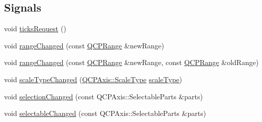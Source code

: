 \subsection*{Signals}
\begin{DoxyCompactItemize}
\item 
void \hyperlink{class_q_c_p_axis_af46d99613d29518795134ec4928e3873}{ticks\+Request} ()
\item 
void \hyperlink{class_q_c_p_axis_a0894084e4c16a1736534c4095746f910}{range\+Changed} (const \hyperlink{class_q_c_p_range}{Q\+C\+P\+Range} \&new\+Range)
\item 
void \hyperlink{class_q_c_p_axis_aac8576288e8e31f16186124bc10dd10d}{range\+Changed} (const \hyperlink{class_q_c_p_range}{Q\+C\+P\+Range} \&new\+Range, const \hyperlink{class_q_c_p_range}{Q\+C\+P\+Range} \&old\+Range)
\item 
void \hyperlink{class_q_c_p_axis_a3505ed8a93bd2e349d858d84996bf767}{scale\+Type\+Changed} (\hyperlink{class_q_c_p_axis_a36d8e8658dbaa179bf2aeb973db2d6f0}{Q\+C\+P\+Axis\+::\+Scale\+Type} \hyperlink{class_q_c_p_axis_a8563e13407bc0616da7f7c84e02de170}{scale\+Type})
\item 
void \hyperlink{class_q_c_p_axis_a62b598abeee7174a05f9d542cc85b1f5}{selection\+Changed} (const Q\+C\+P\+Axis\+::\+Selectable\+Parts \&parts)
\item 
void \hyperlink{class_q_c_p_axis_aa5ff1fd851139028a3bb4efcb31de9fc}{selectable\+Changed} (const Q\+C\+P\+Axis\+::\+Selectable\+Parts \&parts)
\end{DoxyCompactItemize}
